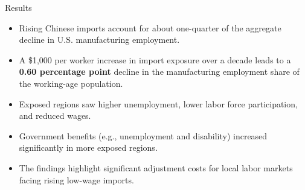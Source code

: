 \documentclass[dvipsnames,hyperref={pdfpagelabels=false}]{beamer}
\begin{document}
\begin{frame}{Results}{}
	\begin{itemize}
		\item Rising Chinese imports account for about one-quarter of the aggregate decline in U.S. manufacturing employment.
				\vspace{0.2cm}
			\item A \$1,000 per worker increase in import exposure over a decade leads to a \textbf{0.60 percentage point} decline in the manufacturing employment share of the working-age population.
		\vspace{0.2cm}		
				
		\item Exposed regions saw higher unemployment, lower labor force participation, and reduced wages.
				\vspace{0.2cm}
		\item Government benefits (e.g., unemployment and disability) increased significantly in more exposed regions.
						\vspace{0.2cm}
			\item The findings highlight significant adjustment costs for local labor markets facing rising low-wage imports.
	\end{itemize}
\end{frame}

\end{document}
